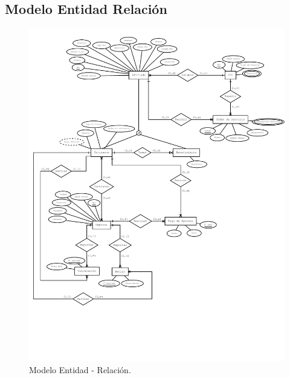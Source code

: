 \documentclass[12pt,a4paper]{article}
\begin{document}
\subsection{Modelo Entidad Relación}
\begin{figure}[H]
\centering
{\includegraphics[width=1\textwidth]{Entity_relationship_diagram.pdf} \par}
\caption{Modelo Entidad - Relación.}
\end{figure}
\end{document}

